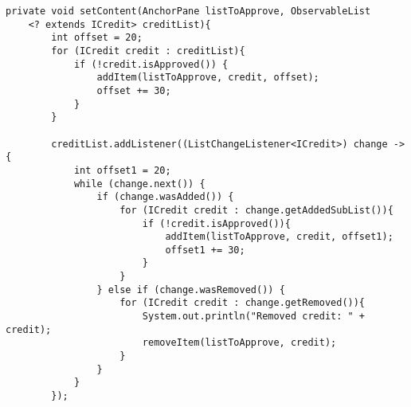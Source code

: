 \begin{lstlisting}[caption = set]
    private void setContent(AnchorPane listToApprove, ObservableList
    <? extends ICredit> creditList){
        int offset = 20;
        for (ICredit credit : creditList){
            if (!credit.isApproved()) {
                addItem(listToApprove, credit, offset);
                offset += 30;
            }
        }

        creditList.addListener((ListChangeListener<ICredit>) change -> {
            int offset1 = 20;
            while (change.next()) {
                if (change.wasAdded()) {
                    for (ICredit credit : change.getAddedSubList()){
                        if (!credit.isApproved()){
                            addItem(listToApprove, credit, offset1);
                            offset1 += 30;
                        }
                    }
                } else if (change.wasRemoved()) {
                    for (ICredit credit : change.getRemoved()){
                        System.out.println("Removed credit: " + credit);
                        removeItem(listToApprove, credit);
                    }
                }
            }
        });
\end{lstlisting}




